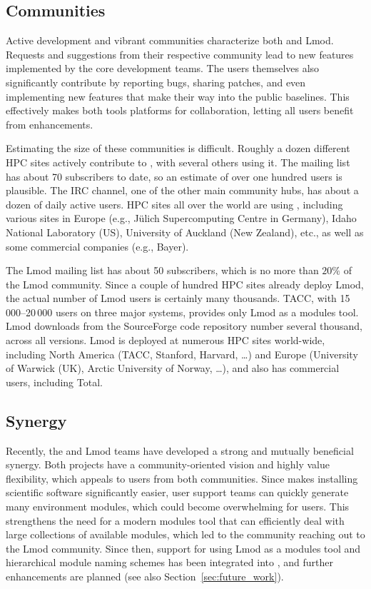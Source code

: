\subsection{Communities}
\label{sec:communities}

Active development and vibrant communities characterize both \easybuild{} and Lmod.
Requests and suggestions from their respective community lead to new features
implemented by the core development teams. The users themselves also significantly
contribute by reporting bugs, sharing patches, and even implementing new features that
make their way into the public baselines. This effectively makes both tools
platforms for collaboration, letting all users benefit from enhancements.

Estimating the size of these communities is difficult. Roughly a dozen different HPC
sites actively contribute to \easybuild{}, with several others using it.
The \easybuild{} mailing list has about 70 subscribers to date, so an
estimate of over one hundred users is plausible. The \easybuild{} IRC channel, one of
the other main community hubs, has about a dozen of daily active users. HPC sites all
over the world are using \easybuild{}, including various sites in Europe
(e.g., J\"ulich Supercomputing Centre in Germany), Idaho National Laboratory (US),
University of Auckland (New Zealand), etc., as well as some commercial companies
(e.g., Bayer).

The Lmod mailing list has about 50 subscribers, which is no more than $20\%$ of the
Lmod community. Since a couple of hundred HPC sites already deploy Lmod, the actual
number of Lmod users is certainly many thousands. TACC, with 15\,000--20\,000
users on three major systems, provides only Lmod as a modules tool. Lmod downloads
from the SourceForge code repository number several thousand, across all versions.
Lmod is deployed at numerous HPC sites world-wide, including North America (TACC,
Stanford, Harvard, \ldots) and Europe (University of Warwick (UK),
Arctic University of Norway, \ldots), and also has commercial users, including Total.

\subsection{Synergy}

Recently, the \easybuild{} and Lmod teams have developed
a strong and mutually beneficial synergy. Both projects have a
community-oriented vision and highly value flexibility, which appeals to users
from both communities. Since \easybuild{} makes installing scientific software
significantly easier, user support teams can quickly generate many environment
modules, which could become overwhelming for users. This strengthens the need for a
modern modules tool that can efficiently deal with large collections of available
modules, which led to the \easybuild{} community reaching out to the Lmod community.
Since then, support for using Lmod as a modules tool and  hierarchical
module naming schemes has been integrated into \easybuild{}, and further
enhancements are planned (see also Section~\ref{sec:future_work}).

